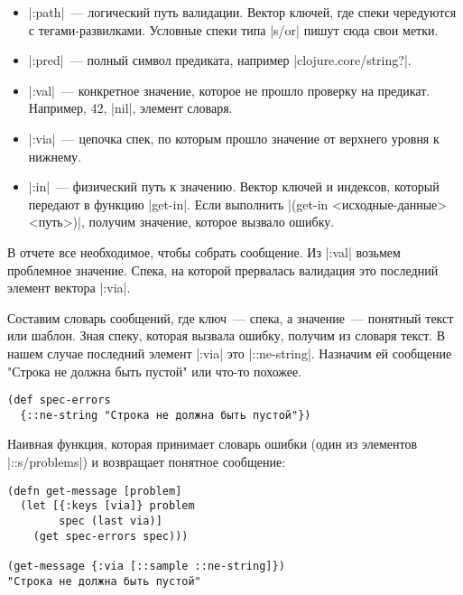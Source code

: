 \begin{itemize}

\item
  \spverb|:path|~--- логический путь валидации. Вектор ключей, где спеки чередуются с
  тегами-развилками. Условные спеки типа \spverb|s/or| пишут сюда свои метки.

\item
  \spverb|:pred|~--- полный символ предиката, например \spverb|clojure.core/string?|.

\item
  \spverb|:val|~--- конкретное значение, которое не прошло проверку на
  предикат. Например, 42, \spverb|nil|, элемент словаря.

\item
  \spverb|:via|~--- цепочка спек, по которым прошло значение от верхнего уровня
  к нижнему.

\item
  \spverb|:in|~--- физический путь к значению. Вектор ключей и индексов, который передают
  в функцию \spverb|get-in|. Если выполнить \spverb|(get-in <исходные-данные> <путь>)|,
  получим значение, которое вызвало ошибку.

\end{itemize}

В отчете все необходимое, чтобы собрать сообщение. Из \spverb|:val| возьмем
проблемное значение. Спека, на которой прервалась валидация это последний
элемент вектора \spverb|:via|.

Составим словарь сообщений, где ключ~--- спека, а значение~--- понятный текст
или шаблон. Зная спеку, которая вызвала ошибку, получим из словаря текст. В
нашем случае последний элемент \spverb|:via| это \spverb|::ne-string|. Назначим
ей сообщение "Строка не должна быть пустой" или что-то похожее.

\begin{verbatim}
(def spec-errors
  {::ne-string "Строка не должна быть пустой"})
\end{verbatim}

Наивная функция, которая принимает словарь ошибки (один из элементов
\spverb|::s/problems|) и возвращает понятное сообщение:

\begin{verbatim}
(defn get-message [problem]
  (let [{:keys [via]} problem
        spec (last via)]
    (get spec-errors spec)))

(get-message {:via [::sample ::ne-string]})
"Строка не должна быть пустой"
\end{verbatim}

